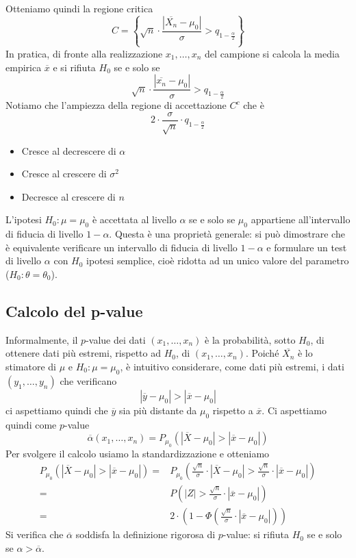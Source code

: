Otteniamo quindi la regione critica
\[
	C = \left\{ \sqrt{n} \cdot \frac{|\overline{X_n} -
		\mu_0|}{\sigma} > q_{1 - \frac{\alpha}{2}} \right\}
\]
In pratica, di fronte alla realizzazione $x_1, \dots, x_n$ del campione si calcola la media
empirica $\overline{x}$ e si rifiuta $H_0$ se e solo se
\[ \sqrt{n} \cdot \frac{|\overline{x_n} - \mu_0|}{\sigma} > q_{1 - \frac{\alpha}{2}}  \]
Notiamo che l'ampiezza della regione di accettazione $C^c$ che è
\[ 2 \cdot \frac{\sigma}{\sqrt{n}} \cdot q_{1 - \frac{\alpha}{2}} \]
\begin{itemize}
	\item Cresce al decrescere di $\alpha$
	\item Cresce al crescere di $\sigma^2$
	\item Decresce al crescere di $n$
\end{itemize}

\begin{observation}
	L'ipotesi $H_0: \mu = \mu_0$ è accettata al livello $\alpha$ se e solo se $\mu_0$ appartiene
	all'intervallo di fiducia di livello $1-\alpha$. Questa è una proprietà generale: si può
	dimostrare che è equivalente verificare un intervallo di fiducia di livello $1-\alpha$ e
	formulare un test di livello $\alpha$ con $H_0$ ipotesi semplice, cioè ridotta ad un unico
	valore del parametro ($H_0 : \theta = \theta_0$).
\end{observation}

\subsection{Calcolo del p-value}
Informalmente, il $p$-value dei dati $(x_1, \dots, x_n)$ è la probabilità, sotto $H_0$, di
ottenere dati più estremi, rispetto ad $H_0$, di $(x_1, \dots, x_n)$. Poiché $\overline{X_n}$ è
lo stimatore di $\mu$ e $H_0: \mu = \mu_0$, è intuitivo considerare, come dati più estremi, i dati
$(y_1, \dots, y_n)$ che verificano
\[ |\overline{y} - \mu_0| > |\overline{x} - \mu_0| \]
ci aspettiamo quindi che $\overline{y}$ sia più distante da $\mu_0$ rispetto a $\overline{x}$. Ci
aspettiamo quindi come $p$-value
\[
	\overline{\alpha} (x_1, \dots, x_n) =
	P_{\mu_0} (|\overline{X} - \mu_0| > |\overline{x} - \mu_0|)
\]
Per svolgere il calcolo usiamo la standardizzazione e otteniamo
\begin{align*}
	P_{\mu_0} (|\overline{X} - \mu_0| > |\overline{x} - \mu_0|)
	= & P_{\mu_0} \left( \frac{\sqrt{n}}{\sigma} \cdot |\overline{X} - \mu_0| >
	\frac{\sqrt{n}}{\sigma} \cdot |\overline{x} - \mu_0| \right)                    \\
	= & P \left( |Z| > \frac{\sqrt{n}}{\sigma} \cdot |\overline{x} - \mu_0| \right) \\
	= & 2 \cdot \left(1 - \Phi \left(\frac{\sqrt{n}}{\sigma} \cdot
		|\overline{x} - \mu_0| \right) \right)
\end{align*}
Si verifica che $\overline{\alpha}$ soddisfa la definizione rigorosa di $p$-value: si rifiuta $H_0$
se e solo se $\alpha > \overline{\alpha}$.